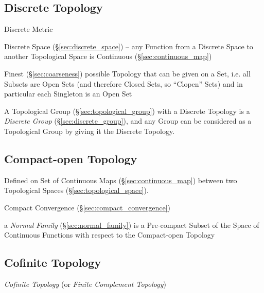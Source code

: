 \subsection{Discrete Topology}\label{sec:discrete_topology}

Discrete Metric

Discrete Space (\S\ref{sec:discrete_space}) -- any Function from a Discrete
Space to another Topological Space is Continuous (\S\ref{sec:continuous_map})

Finest (\S\ref{sec:coarseness}) possible Topology that can be given on a Set,
i.e. all Subsets are Open Sets (and therefore Closed Sets, so ``Clopen'' Sets)
and in particular each Singleton is an Open Set

A Topological Group (\S\ref{sec:topological_group}) with a Discrete Topology is
a \emph{Discrete Group} (\S\ref{sec:discrete_group}), and any Group can be
considered as a Topological Group by giving it the Discrete Topology.



\subsection{Compact-open Topology}\label{sec:compact_open}

Defined on Set of Continuous Maps (\S\ref{sec:continuous_map}) between two
Topological Spaces (\S\ref{sec:topological_space}).

Compact Convergence (\S\ref{sec:compact_convergence})

a \emph{Normal Family} (\S\ref{sec:normal_family}) is a Pre-compact Subset of
the Space of Continuous Functions with respect to the Compact-open Topology



\subsection{Cofinite Topology}\label{sec:cofinite_topology}

\emph{Cofinite Topology} (or \emph{Finite Complement Topology})



